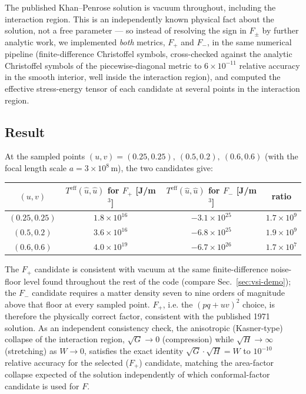 \documentclass[aps,onecolumn,10pt,nofootinbib]{revtex4-2}
\begin{document}
The published Khan--Penrose solution is vacuum throughout, including the
interaction region. This is an independently known physical fact about the
solution, not a free parameter — so instead of resolving the sign in
$F_\pm$ by further analytic work, we implemented \emph{both} metrics,
$F_+$ and $F_-$, in the same numerical pipeline (finite-difference
Christoffel symbols, cross-checked against the analytic Christoffel
symbols of the piecewise-diagonal metric to $6\times 10^{-11}$ relative
accuracy in the smooth interior, well inside the interaction region), and
computed the effective stress-energy tensor of each candidate at several
points in the interaction region.

\subsection{Result}

At the sampled points $(u,v) = (0.25,0.25),\ (0.5,0.2),\ (0.6,0.6)$ (with
the focal length scale $a=3\times10^8\,\mathrm{m}$), the two candidates
give:

\begin{center}
\begin{tabular}{c c c c}
\hline\hline
$(u,v)$ & $T^{\text{eff}}(\hat u,\hat u)$ for $F_+$ [J/m$^3$] & $T^{\text{eff}}(\hat u,\hat u)$ for $F_-$ [J/m$^3$] & ratio \\
\hline
$(0.25,0.25)$ & $1.8\times 10^{16}$ & $-3.1\times 10^{25}$ & $1.7\times 10^{9}$ \\
$(0.5,0.2)$   & $3.6\times 10^{16}$ & $-6.8\times 10^{25}$ & $1.9\times 10^{9}$ \\
$(0.6,0.6)$   & $4.0\times 10^{19}$ & $-6.7\times 10^{26}$ & $1.7\times 10^{7}$ \\
\hline\hline
\end{tabular}
\end{center}

The $F_+$ candidate is consistent with vacuum at the same finite-difference
noise-floor level found throughout the rest of the code (compare
Sec.~\ref{sec:vsi-demo}); the $F_-$ candidate requires a matter density
seven to nine orders of magnitude above that floor at every sampled point.
$F_+$, i.e. the $(pq+uv)^2$ choice, is therefore the physically correct
factor, consistent with the published 1971 solution. As an independent
consistency check, the anisotropic (Kasner-type) collapse of the
interaction region, $\sqrt{G}\to 0$ (compression) while $\sqrt{H}\to\infty$
(stretching) as $W\to 0$, satisfies the exact identity
$\sqrt{G}\cdot\sqrt{H} = W$ to $10^{-10}$ relative accuracy for the
selected ($F_+$) candidate, matching the area-factor collapse expected of
the solution independently of which conformal-factor candidate is used
for $F$.
\end{document}
